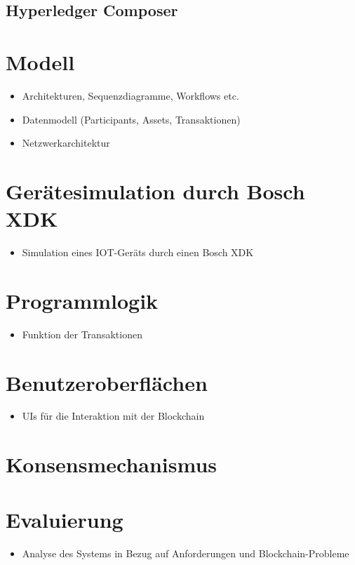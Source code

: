 \subsection{Hyperledger Composer}

\section{Modell}
\begin{itemize}
    \item Architekturen, Sequenzdiagramme, Workflows etc.
    \item Datenmodell (Participants, Assets, Transaktionen)
    \item Netzwerkarchitektur
\end{itemize}

\section{Gerätesimulation durch Bosch XDK}
\begin{itemize}
    \item Simulation eines IOT-Geräts durch einen Bosch XDK
\end{itemize}

\section{Programmlogik}
\begin{itemize}
    \item Funktion der Transaktionen
\end{itemize}

\section{Benutzeroberflächen}
\begin{itemize}
    \item UIs für die Interaktion mit der Blockchain
\end{itemize}

\section{Konsensmechanismus}



\section{Evaluierung}
\begin{itemize}
    \item Analyse des Systems in Bezug auf Anforderungen und Blockchain-Probleme
\end{itemize}



